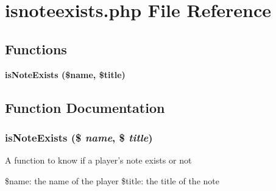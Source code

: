 \section{isnoteexists.php File Reference}
\label{isnoteexists_8php}


\subsection*{Functions}
\begin{CompactItemize}
\item 
\bf{is\-Note\-Exists} (\$name, \$title)
\end{CompactItemize}


\subsection{Function Documentation}
\subsubsection{\setlength{\rightskip}{0pt plus 5cm}is\-Note\-Exists (\$ {\em name}, \$ {\em title})}\label{isnoteexists_8php_abac94464c614a2a297cf298d627f20f}


A function to know if a player's note exists or not

\$name: the name of the player \$title: the title of the note 